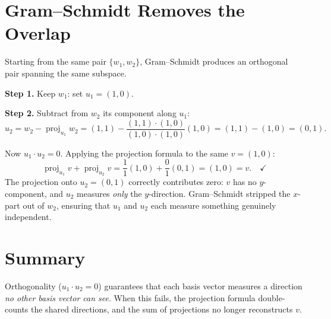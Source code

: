 \documentclass[11pt]{article}
\newcommand{\proj}{\operatorname{proj}}
\begin{document}
\section*{Gram--Schmidt Removes the Overlap}

Starting from the same pair $\{w_1, w_2\}$, Gram--Schmidt produces an orthogonal pair spanning the same subspace.

\textbf{Step 1.} Keep $w_1$: set $u_1 = (1, 0)$.

\textbf{Step 2.} Subtract from $w_2$ its component along $u_1$:
\[
    u_2
    = w_2 - \proj_{u_1} w_2
    = (1, 1) - \frac{(1,1)\cdot(1,0)}{(1,0)\cdot(1,0)}(1,0)
    = (1,1) - (1,0)
    = (0, 1).
\]

Now $u_1 \cdot u_2 = 0$. Applying the projection formula to the same $v = (1,0)$:
\[
    \proj_{u_1} v + \proj_{u_2} v
    = \frac{1}{1}(1,0) + \frac{0}{1}(0,1)
    = (1,0)
    = v. \quad \checkmark
\]
The projection onto $u_2 = (0,1)$ correctly contributes zero: $v$ has no $y$-component,
and $u_2$ measures \emph{only} the $y$-direction.
Gram--Schmidt stripped the $x$-part out of $w_2$, ensuring that $u_1$ and $u_2$ each measure something genuinely independent.

\section*{Summary}

Orthogonality ($u_1 \cdot u_2 = 0$) guarantees that each basis vector measures a direction \emph{no other basis vector can see}.
When this fails, the projection formula double-counts the shared directions,
and the sum of projections no longer reconstructs $v$.
\end{document}
